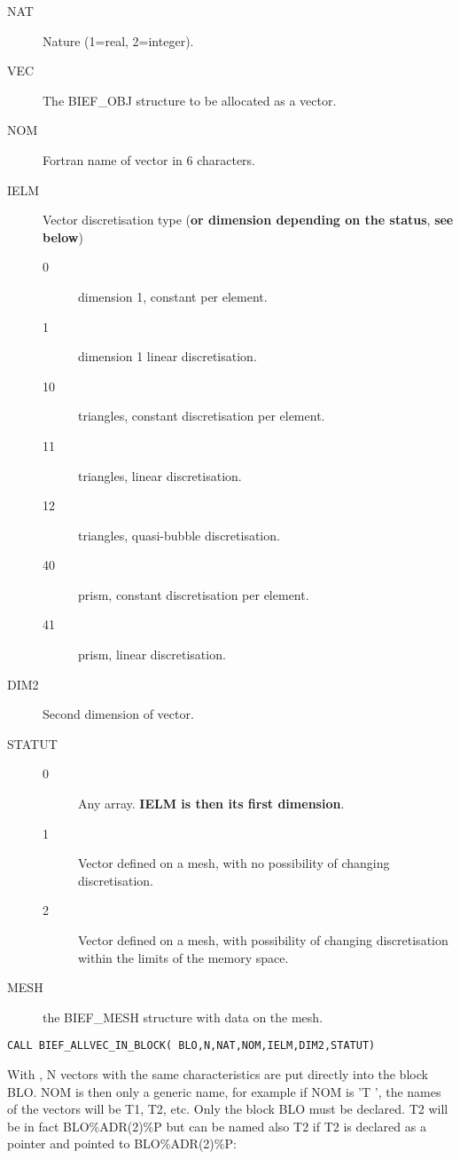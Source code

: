 \begin{description}
\item [NAT] Nature (1=real, 2=integer).
\item [VEC] The BIEF\_OBJ structure to be allocated as a vector.
\item [NOM] Fortran name of vector in 6 characters.
\item [IELM] Vector discretisation type (\textbf{or dimension depending on
  the status}, \textbf{see below})
\begin{description}
  \item [0] dimension 1, constant per element.
  \item [1] dimension 1 linear discretisation.
  \item [10] triangles, constant discretisation per element.
  \item [11] triangles, linear discretisation.
  \item [12] triangles, quasi-bubble discretisation.
  \item [40] prism, constant discretisation per element.
  \item [41] prism, linear discretisation.
\end{description}
\item [DIM2] Second dimension of vector.
\item [STATUT]
 \begin{description}
   \item [0] Any array. \textbf{IELM is then its first dimension}.
   \item [1] Vector defined on a mesh, with no possibility of changing
     discretisation.
   \item [2] Vector defined on a mesh, with possibility of changing
     discretisation within   the limits of the memory space.
\end{description}
\item [MESH] the BIEF\_MESH structure with data on the mesh.
\end{description}

\begin{lstlisting}[language=TelFortran]
CALL BIEF_ALLVEC_IN_BLOCK( BLO,N,NAT,NOM,IELM,DIM2,STATUT)
\end{lstlisting}

With , N vectors with the same characteristics
are put directly into the block BLO. NOM is then only a generic name, for
example if NOM is 'T     ', the names of the vectors will be T1, T2, etc. Only
the block BLO must be declared. T2 will be in fact BLO\%ADR(2)\%P but can be
named also T2 if T2 is declared as a  pointer and pointed to
BLO\%ADR(2)\%P:

